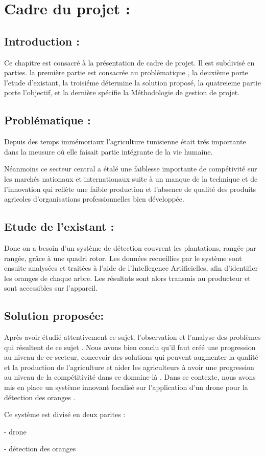 \documentclass[a4paper,12pt]{report}
\begin{document}
	\chapter{Cadre du projet :}
	\newpage
	
	
	\section{Introduction :}
	Ce chapitre est consacré à la présentation de cadre de projet. Il est subdivisé en  parties.
	la première partie est consacrée au problématique , la deuxième
	porte l'etude d'existant, la troisiéme détermine la  solution proposé, la quatreieme partie porte l’objectif, et la dernière spécifie la Méthodologie de gestion de projet.
	\section{Problématique :}
	Depuis des temps immémoriaux l'agriculture tunisienne était trés importante dans la meusure où elle faisait partie intégrante de la vie humaine.
	\par
	Néanmoins ce secteur central a étalé une faiblesse importante de compétivité sur les marchés nationaux et internationaux suite à un manque de la technique et de l'innovation qui reflète une faible production et l'absence de qualité des produits agricoles d'organisations professionnelles bien développée.
	
	\section{Etude de l’existant :}
	
	Donc on a besoin d'un système de détection couvrent les plantations, rangée par rangée, grâce à une quadri rotor. Les données recueillies par le système sont ensuite analysées et traitées à l’aide de l’Intellegence Artificielles, afin d’identifier les oranges de chaque arbre. Les résultats sont alors transmis au producteur et sont accessibles sur l'appareil.
	\section{Solution proposée: }
	Après avoir étudié attentivement ce sujet, l'observation et l'analyse des problèmes qui résultent de ce sujet . Nous avons bien conclu qu'il faut créé une progression au niveau de ce secteur, concevoir des solutions qui peuvent augmenter la qualité et la production de l'agriculture et aider les agriculteurs à avoir une progression au niveau de la compétitivité dans ce domaine-là . Dans ce contexte, nous avons mis en place un système innovant focalisé sur l'application d'un drone pour la détection des oranges .
	\par
	Ce système est divisé en deux parites :
	\par
	- drone 
	\par
	- détection des oranges
	\newpage
\end{document}
